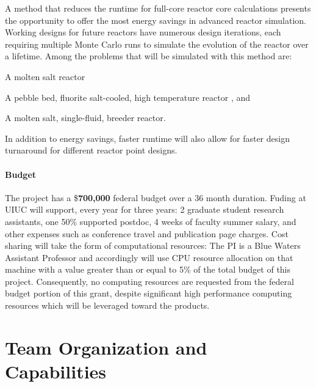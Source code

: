 \documentclass[letterpaper,12pt]{article}
\begin{document}
A method that reduces the runtime for full-core reactor core calculations
presents the opportunity to offer the most energy savings in advanced reactor
simulation. Working designs for future reactors have numerous design iterations,
each requiring multiple Monte Carlo runs to simulate the evolution of the
reactor over a lifetime. Among the problems that will be
simulated with this method are:
\begin{compactitem}
  \item A molten salt reactor \cite{robertson_msre_1965}
  \item A pebble bed, fluorite salt-cooled, high temperature
    reactor \cite{andreades_design_2016}, and
  \item A molten salt, single-fluid, breeder
    reactor\cite{robertson_conceptual_1971}.
\end{compactitem}
In addition to energy savings, faster runtime will also allow for faster design
turnaround for different reactor point designs.
\paragraph{Budget} The project has a \$\textbf{700,000} federal budget over a
36 month duration. Fuding at UIUC will support, every year for three years: 2
graduate student research assistants, one 50\% supported postdoc, 4 weeks of
faculty summer salary, and other expenses such as conference travel and
publication page charges. Cost sharing will take the form of computational
resources: The PI is a Blue Waters Assistant Professor and accordingly will
use CPU resource allocation on that machine with a value greater than or equal
to 5\% of the total budget of this project. Consequently, no computing
resources are requested from the federal budget portion of this grant, despite
significant high performance computing resources which will be leveraged toward
the products.


\section{Team Organization and Capabilities}
\end{document}
